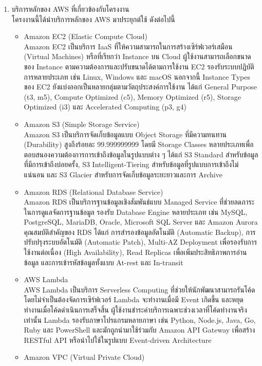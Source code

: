 \begin{itemize}
\begin{enumerate}
        \item บริการหลักของ AWS ที่เกี่ยวข้องกับโครงงาน \\
        โครงงานนี้ได้นำบริการหลักของ AWS มาประยุกต์ใช้ ดังต่อไปนี้
    \begin{itemize}
    \item Amazon EC2 (Elastic Compute Cloud)\\
          Amazon EC2 เป็นบริการ IaaS ที่ให้ความสามารถในการสร้างเซิร์ฟเวอร์เสมือน (Virtual Machines) หรือที่เรียกว่า Instance บน Cloud ผู้ใช้งานสามารถเลือกขนาดของ Instance ตามความต้องการและปรับขนาดได้ตามการใช้งาน EC2 รองรับระบบปฏิบัติการหลายประเภท เช่น Linux, Windows และ macOS นอกจากนี้ Instance Types ของ EC2 ยังแบ่งออกเป็นหลายกลุ่มตามวัตถุประสงค์การใช้งาน ได้แก่ General Purpose (t3, m5), Compute Optimized (c5), Memory Optimized (r5), Storage Optimized (i3) และ Accelerated Computing (p3, g4)
    \item Amazon S3 (Simple Storage Service) \\
        Amazon S3 เป็นบริการจัดเก็บข้อมูลแบบ Object Storage ที่มีความทนทาน (Durability) สูงถึงร้อยละ 99.999999999 โดยมี Storage Classes หลายประเภทเพื่อตอบสนองความต้องการการเข้าถึงข้อมูลในรูปแบบต่าง ๆ ได้แก่ S3 Standard สำหรับข้อมูลที่มีการเข้าถึงบ่อยครั้ง, S3 Intelligent-Tiering สำหรับข้อมูลที่รูปแบบการเข้าถึงไม่แน่นอน และ S3 Glacier สำหรับการจัดเก็บข้อมูลระยะยาวและการ Archive
    \item  Amazon RDS (Relational Database Service) \\
    Amazon RDS เป็นบริการฐานข้อมูลเชิงสัมพันธ์แบบ Managed Service ที่ช่วยลดภาระในการดูแลจัดการฐานข้อมูล รองรับ Database Engine หลายประเภท เช่น MySQL, PostgreSQL, MariaDB, Oracle, Microsoft SQL Server และ Amazon Aurora คุณสมบัติสำคัญของ RDS ได้แก่ การสำรองข้อมูลอัตโนมัติ (Automatic Backup), การปรับปรุงระบบอัตโนมัติ (Automatic Patch), Multi-AZ Deployment เพื่อรองรับการใช้งานต่อเนื่อง (High Availability), Read Replicas เพื่อเพิ่มประสิทธิภาพการอ่านข้อมูล และการเข้ารหัสข้อมูลทั้งแบบ At-rest และ In-transit
    \item AWS Lambda \\
    AWS Lambda เป็นบริการ Serverless Computing ที่ช่วยให้นักพัฒนาสามารถรันโค้ดโดยไม่จำเป็นต้องจัดการเซิร์ฟเวอร์ Lambda จะทำงานเมื่อมี Event เกิดขึ้น และหยุดทำงานเมื่อโค้ดดำเนินการเสร็จสิ้น ผู้ใช้งานชำระค่าบริการเฉพาะช่วงเวลาที่โค้ดทำงานจริงเท่านั้น Lambda รองรับภาษาโปรแกรมหลายภาษา เช่น Python, Node.js, Java, Go, Ruby และ PowerShell และมักถูกนำมาใช้ร่วมกับ Amazon API Gateway เพื่อสร้าง RESTful API หรือนำไปใช้ในรูปแบบ Event-driven Architecture
    \item Amazon VPC (Virtual Private Cloud) \\

\end{itemize}
\end{enumerate}
\end{itemize}
